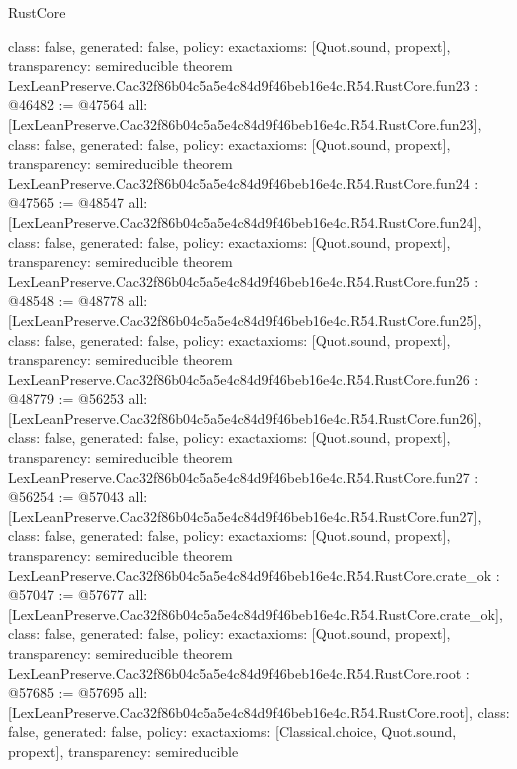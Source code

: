 \begin{lexlean}{RustCore}
\begin{coremodule}
{  class: false,
  generated: false,
  policy: exact{axioms: [Quot.sound, propext]},
  transparency: semireducible
}
theorem LexLeanPreserve.Cac32f86b04c5a5e4c84d9f46beb16e4c.R54.RustCore.fun23 : @46482 := @47564 {
  all: [LexLeanPreserve.Cac32f86b04c5a5e4c84d9f46beb16e4c.R54.RustCore.fun23],
  class: false,
  generated: false,
  policy: exact{axioms: [Quot.sound, propext]},
  transparency: semireducible
}
theorem LexLeanPreserve.Cac32f86b04c5a5e4c84d9f46beb16e4c.R54.RustCore.fun24 : @47565 := @48547 {
  all: [LexLeanPreserve.Cac32f86b04c5a5e4c84d9f46beb16e4c.R54.RustCore.fun24],
  class: false,
  generated: false,
  policy: exact{axioms: [Quot.sound, propext]},
  transparency: semireducible
}
theorem LexLeanPreserve.Cac32f86b04c5a5e4c84d9f46beb16e4c.R54.RustCore.fun25 : @48548 := @48778 {
  all: [LexLeanPreserve.Cac32f86b04c5a5e4c84d9f46beb16e4c.R54.RustCore.fun25],
  class: false,
  generated: false,
  policy: exact{axioms: [Quot.sound, propext]},
  transparency: semireducible
}
theorem LexLeanPreserve.Cac32f86b04c5a5e4c84d9f46beb16e4c.R54.RustCore.fun26 : @48779 := @56253 {
  all: [LexLeanPreserve.Cac32f86b04c5a5e4c84d9f46beb16e4c.R54.RustCore.fun26],
  class: false,
  generated: false,
  policy: exact{axioms: [Quot.sound, propext]},
  transparency: semireducible
}
theorem LexLeanPreserve.Cac32f86b04c5a5e4c84d9f46beb16e4c.R54.RustCore.fun27 : @56254 := @57043 {
  all: [LexLeanPreserve.Cac32f86b04c5a5e4c84d9f46beb16e4c.R54.RustCore.fun27],
  class: false,
  generated: false,
  policy: exact{axioms: [Quot.sound, propext]},
  transparency: semireducible
}
theorem LexLeanPreserve.Cac32f86b04c5a5e4c84d9f46beb16e4c.R54.RustCore.crate_ok : @57047 := @57677 {
  all: [LexLeanPreserve.Cac32f86b04c5a5e4c84d9f46beb16e4c.R54.RustCore.crate_ok],
  class: false,
  generated: false,
  policy: exact{axioms: [Quot.sound, propext]},
  transparency: semireducible
}
theorem LexLeanPreserve.Cac32f86b04c5a5e4c84d9f46beb16e4c.R54.RustCore.root : @57685 := @57695 {
  all: [LexLeanPreserve.Cac32f86b04c5a5e4c84d9f46beb16e4c.R54.RustCore.root],
  class: false,
  generated: false,
  policy: exact{axioms: [Classical.choice, Quot.sound, propext]},
  transparency: semireducible
}


\end{coremodule}
\end{lexlean}
